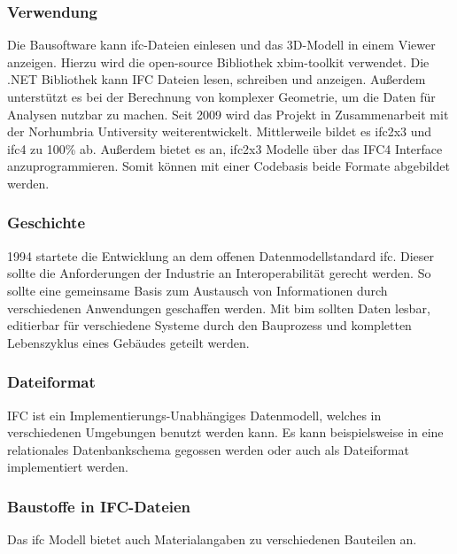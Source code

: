 \subsubsection{Verwendung}

Die Bausoftware kann \ac{ifc}-Dateien einlesen und das 3D-Modell in einem Viewer anzeigen. Hierzu wird die open-source Bibliothek xbim-toolkit verwendet. Die .NET Bibliothek kann IFC Dateien lesen, schreiben und anzeigen. Außerdem unterstützt es bei der Berechnung von komplexer Geometrie, um die Daten für Analysen nutzbar zu machen. Seit 2009 wird das Projekt in Zusammenarbeit mit der Norhumbria Untiversity weiterentwickelt. Mittlerweile bildet es \ac{ifc2x3} und \ac{ifc4} zu 100\% ab. Außerdem bietet es an, \ac{ifc2x3} Modelle über das IFC4 Interface anzuprogrammieren. Somit können mit einer Codebasis beide Formate abgebildet werden. \cite{xbim}



\subsubsection{Geschichte}

1994 startete die Entwicklung an dem offenen Datenmodellstandard \ac{ifc}. Dieser sollte die Anforderungen der Industrie an Interoperabilität gerecht werden. So sollte eine gemeinsame Basis zum Austausch von Informationen durch verschiedenen Anwendungen geschaffen werden. Mit \ac{bim} sollten Daten lesbar, editierbar für verschiedene Systeme durch den Bauprozess und kompletten Lebenszyklus eines Gebäudes geteilt werden. \cite{Laakso2012-oi}

\subsubsection{Dateiformat}

IFC ist ein Implementierungs-Unabhängiges Datenmodell, welches in verschiedenen Umgebungen benutzt werden kann. Es kann beispielsweise in eine relationales Datenbankschema gegossen werden oder auch als Dateiformat implementiert werden. \cite{Laakso2012-oi}



\subsubsection{Baustoffe in IFC-Dateien}
Das \ac{ifc} Modell bietet auch Materialangaben zu verschiedenen Bauteilen an. \cite{IFC4_doc}

